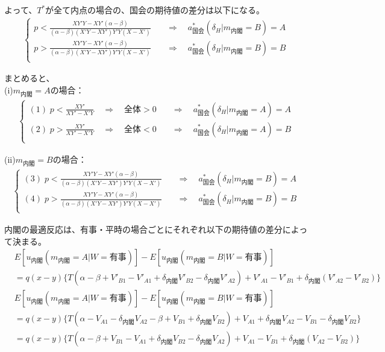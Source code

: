 \documentclass[main.tex]{subfiles}
\begin{document}
よって、$T^*$が全て内点の場合の、国会の期待値の差分は以下になる。
\begin{align*}
    \begin{cases}
        p  < \frac{XY'Y - XY'(\alpha - \beta)}{ (\alpha - \beta)( X'Y- XY')Y'Y(X - X') }   &\quad\Rightarrow\quad a^*_{国会}(\delta_H|m_{内閣} = B) = A\\[0.5em]
        p  > \frac{XY'Y - XY'(\alpha - \beta)}{ (\alpha - \beta)( X'Y- XY')Y'Y(X - X') }  &\quad\Rightarrow\quad a^*_{国会}(\delta_H|m_{内閣} = B) = B\\[0.5em] 
     \end{cases}
\end{align*}


\bigskip
まとめると、\\
\noindent
(i)$m_{内閣}=A$の場合：
\begin{align*}
    \begin{cases}
        (1)\; p < \frac{XY'}{XY' - X'Y} \quad\Rightarrow\quad 全体>0 &\quad\Rightarrow\quad a^*_{国会}(\delta_H|m_{内閣} = A) = A\\[0.5em]
        (2)\; p > \frac{XY'}{XY' - X'Y} \quad\Rightarrow\quad 全体<0 &\quad\Rightarrow\quad a^*_{国会}(\delta_H|m_{内閣} = A) = B\\[0.5em] 
     \end{cases}
\end{align*}


\noindent
(ii)$m_{内閣}=B$の場合：
\begin{align*}
    \begin{cases}
        (3)\; p  < \frac{XY'Y - XY'(\alpha - \beta)}{ (\alpha - \beta)( X'Y- XY')Y'Y(X - X') }   &\quad\Rightarrow\quad a^*_{国会}(\delta_H|m_{内閣} = B) = A\\[0.5em]
        (4)\; p  > \frac{XY'Y - XY'(\alpha - \beta)}{ (\alpha - \beta)( X'Y- XY')Y'Y(X - X') }  &\quad\Rightarrow\quad a^*_{国会}(\delta_H|m_{内閣} = B) = B\\[0.5em] 
     \end{cases}
\end{align*}


内閣の最適反応は、有事・平時の場合ごとにそれぞれ以下の期待値の差分によって決まる。
\begin{align*}
    &E[u_{内閣}(m_{内閣}=A|W=有事)] - E[u_{内閣}(m_{内閣}=B|W=有事)] \\
    &= q(x-y) \lbrace T(\alpha-\beta + V'_{B1}-V'_{A1} + \delta_{内閣}V'_{B2} - \delta_{内閣}V'_{A2}) + V'_{A1} - V'_{B1} + \delta_{内閣}(V'_{A2} - V'_{B2})  \rbrace 
\end{align*}
\begin{align*}
    &E[u_{内閣}(m_{内閣}=A|W=有事)] - E[u_{内閣}(m_{内閣}=B|W=有事)] \\
    &= q(x-y)\lbrace T(\alpha -V_{A1} -\delta_{内閣}V_{A2} - \beta + V_{B1} + \delta_{内閣}V_{B2}) + V_{A1} + \delta_{内閣}V_{A2} - V_{B1} - \delta_{内閣}V_{B2}  \rbrace\\
    &= q(x-y)\lbrace T(\alpha - \beta + V_{B1}-V_{A1} + \delta_{内閣}V_{B2} -\delta_{内閣}V_{A2}   ) + V_{A1} - V_{B1} + \delta_{内閣}(V_{A2}  - V_{B2})  \rbrace
\end{align*}
\end{document}
